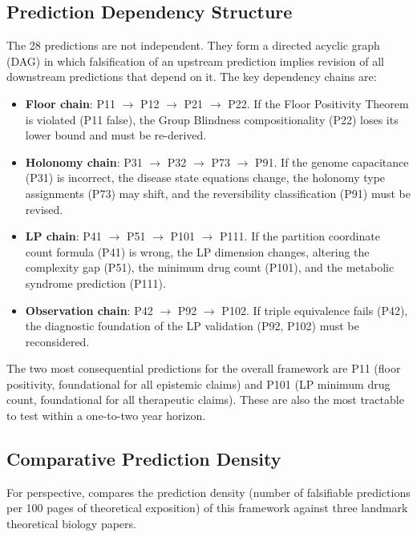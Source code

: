 \subsection{Prediction Dependency Structure}

The 28 predictions are not independent.  They form a directed acyclic graph
(DAG) in which falsification of an upstream prediction implies revision of all
downstream predictions that depend on it.  The key dependency chains are:

\begin{itemize}[leftmargin=2em]
  \item \textbf{Floor chain}: P11 $\to$ P12 $\to$ P21 $\to$ P22.  If the
    Floor Positivity Theorem is violated (P11 false), the Group Blindness
    compositionality (P22) loses its lower bound and must be re-derived.
  \item \textbf{Holonomy chain}: P31 $\to$ P32 $\to$ P73 $\to$ P91.  If the
    genome capacitance (P31) is incorrect, the disease state equations change,
    the holonomy type assignments (P73) may shift, and the reversibility
    classification (P91) must be revised.
  \item \textbf{LP chain}: P41 $\to$ P51 $\to$ P101 $\to$ P111.  If the
    partition coordinate count formula (P41) is wrong, the LP dimension changes,
    altering the complexity gap (P51), the minimum drug count (P101), and the
    metabolic syndrome prediction (P111).
  \item \textbf{Observation chain}: P42 $\to$ P92 $\to$ P102.  If triple
    equivalence fails (P42), the diagnostic foundation of the LP validation
    (P92, P102) must be reconsidered.
\end{itemize}

The two most consequential predictions for the overall framework are P11
(floor positivity, foundational for all epistemic claims) and P101 (LP minimum
drug count, foundational for all therapeutic claims).  These are also the
most tractable to test within a one-to-two year horizon.

\subsection{Comparative Prediction Density}

For perspective,  compares the prediction
density (number of falsifiable predictions per 100 pages of theoretical
exposition) of this framework against three landmark theoretical biology papers.

